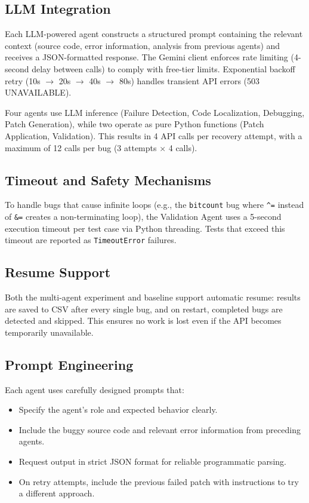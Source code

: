 \documentclass[conference]{IEEEtran}
\begin{document}
\subsection{LLM Integration}
Each LLM-powered agent constructs a structured prompt containing the relevant context (source code, error information, analysis from previous agents) and receives a JSON-formatted response. The Gemini client enforces rate limiting (4-second delay between calls) to comply with free-tier limits. Exponential backoff retry (10s $\rightarrow$ 20s $\rightarrow$ 40s $\rightarrow$ 80s) handles transient API errors (503 UNAVAILABLE).

Four agents use LLM inference (Failure Detection, Code Localization, Debugging, Patch Generation), while two operate as pure Python functions (Patch Application, Validation). This results in 4 API calls per recovery attempt, with a maximum of 12 calls per bug (3 attempts $\times$ 4 calls).

\subsection{Timeout and Safety Mechanisms}
To handle bugs that cause infinite loops (e.g., the \texttt{bitcount} bug where \texttt{\^{}=} instead of \texttt{\&=} creates a non-terminating loop), the Validation Agent uses a 5-second execution timeout per test case via Python threading. Tests that exceed this timeout are reported as \texttt{TimeoutError} failures.

\subsection{Resume Support}
Both the multi-agent experiment and baseline support automatic resume: results are saved to CSV after every single bug, and on restart, completed bugs are detected and skipped. This ensures no work is lost even if the API becomes temporarily unavailable.

\subsection{Prompt Engineering}
Each agent uses carefully designed prompts that:
\begin{itemize}
    \item Specify the agent's role and expected behavior clearly.
    \item Include the buggy source code and relevant error information from preceding agents.
    \item Request output in strict JSON format for reliable programmatic parsing.
    \item On retry attempts, include the previous failed patch with instructions to try a different approach.
\end{itemize}
\end{document}
